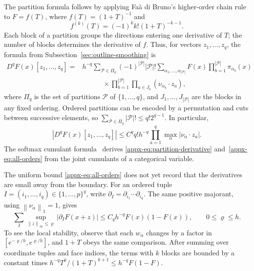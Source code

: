 \documentclass[11pt,letterpaper]{article}
\theoremstyle{remark}
\newcommand{\norm}[1]{\left\lVert#1\right\rVert}
\begin{document}
The partition formula follows by applying Fa\`a di Bruno's
higher-order chain rule~\cite{Comtet1974} to \(F=f(T)\), where
\(f(T)=(1+T)^{-1}\) and
\[
 f^{(k)}(T)=(-1)^k k!(1+T)^{-k-1}.
\]
Each block of a partition groups the directions entering one
derivative of \(T\); the number of blocks determines the derivative
of \(f\). Thus, for vectors \(z_1,\ldots,z_q\), the formula from
Subsection~\ref{sec:outline-smoothing} is
\begin{equation}
 \begin{split}
 D^qF(x)[z_1,\ldots,z_q]
 ={}&h^{-q}\sum_{\mathcal P\in\Pi_q}(-1)^{|\mathcal P|}|\mathcal P|!
 \sum_{\alpha_1,\ldots,\alpha_{|\mathcal P|}}
 F(x)\prod_{b=1}^{|\mathcal P|}\pi_{\alpha_b}(x)\\
 &\hspace{3em}\times
 \prod_{b=1}^{|\mathcal P|}\prod_{a\in J_b}
 (\nu_{\alpha_b}\cdot z_a),
 \end{split}
 \label{appx-eq:partition-derivative}
\end{equation}
where \(\Pi_q\) is the set of partitions \(\mathcal P\) of \(\{1,\ldots,q\}\),
and \(J_1,\ldots,J_{|\mathcal P|}\) are the blocks in any fixed ordering.
Ordered partitions can be encoded by a permutation and cuts between
successive elements, so
\(\sum_{\mathcal P\in\Pi_q}|\mathcal P|!\le q!2^{q-1}\).
In particular,
\begin{equation}
 |D^qF(x)[z_1,\ldots,z_q]|
 \le C^q q!h^{-q}\prod_{a=1}^q
 \max_\alpha|\nu_\alpha\cdot z_a|.
 \label{appx-eq:all-orders}
\end{equation}
The softmax cumulant formula~\cite[Lemma~13]{GaoZhang} derives
\eqref{appx-eq:partition-derivative} and~\eqref{appx-eq:all-orders}
from the joint cumulants of a categorical variable.

The uniform bound \eqref{appx-eq:all-orders} does not yet record that the
derivatives are small away from the boundary. For an ordered tuple
\(I=(i_1,\ldots,i_q)\in\{1,\ldots,p\}^q\), write
\(\partial_I=\partial_{i_1}\cdots\partial_{i_q}\).
The same positive majorant, using \(\norm{\nu_\alpha}_1=1\), gives
\begin{equation}
 \sum_I\sup_{\norm z_\infty\le\varrho}|\partial_IF(x+z)|
 \le C_qh^{-q}F(x)(1-F(x)),\qquad 0\le\varrho\le h.
 \label{appx-eq:local-envelope}
\end{equation}
To see the local stability, observe that each \(w_\alpha\)
changes by a factor in
\([e^{-\varrho/h},e^{\varrho/h}]\), and \(1+T\) obeys the same comparison.
After summing over coordinate tuples and face indices, the terms with
\(k\) blocks are bounded by a constant times
\(h^{-q}T^k/(1+T)^{k+1}\le h^{-q}F(1-F)\).
\end{document}
